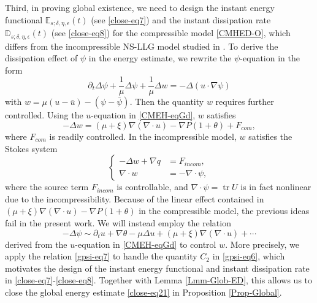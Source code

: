 \documentclass[reqno,11pt]{amsart}
\numberwithin{equation}{section}
\begin{document}
Third, in proving global existence, we need to design the instant energy functional $\mathbb{E}_{s;\delta,\eta,\epsilon}(t)$ (see \eqref{close-eq7}) and the instant dissipation rate $ \mathbb{D}_{s;\delta,\eta,\epsilon}(t) $ (see \eqref{close-eq8}) for the compressible model \eqref{CMHED-O}, which differs from the incompressible NS-LLG model studied in \cite{JLL-JDE-2023}. To derive the dissipation effect of $\psi$ in the energy estimate, we rewrite the $ \psi $-equation in the form
$$
\partial_t \Delta \psi + \frac{1}{\mu} \Delta \psi + \frac{1}{\mu} \Delta w = -\Delta(u \cdot \nabla \psi)
$$
with $ w = \mu(u - \bar{u}) - (\psi - \bar{\psi}) $. Then the quantity $w$ requires further controlled. Using the $u$-equation in \eqref{CMEH-eqGd}, $w$ satisfies 
$$
-\Delta w = (\mu + \xi) \nabla (\nabla \cdot u) - \nabla P(1 + \theta) + F_{com},
$$
where $F_{com}$ is readily controlled. In the incompressible model, $w$ satisfies the Stokes system
$$
\left\{
\begin{aligned}
-\Delta w + \nabla q &= F_{{incom}}, \\
\nabla \cdot w &= -\nabla \cdot \psi,
\end{aligned}
\right.
$$
where the source term $F_{{incom}}$ is controllable, and $\nabla \cdot \psi = \operatorname{tr} U$ is in fact nonlinear due to the incompressibility. Because of the linear effect contained in $(\mu + \xi) \nabla (\nabla \cdot u) - \nabla P(1 + \theta)$ in the compressible model, the previous ideas fail in the present work. We will instead employ the relation
$$ -\Delta \psi \sim \partial_{t} u + \nabla \theta -\mu \Delta u +(\mu + \xi) \nabla (\nabla \cdot u) + \cdots  $$
derived from the $u$-equation in \eqref{CMEH-eqGd} to control $w$. More precisely, we apply the relation \eqref{gpsi-eq7} to handle the quantity $C_2$ in \eqref{gpsi-eq6}, which motivates the design of the instant energy functional and instant dissipation rate in \eqref{close-eq7}-\eqref{close-eq8}. Together with Lemma \ref{Lmm-Glob-ED}, this allows us to close the global energy estimate \eqref{close-eq21} in Proposition \ref{Prop-Global}.
\end{document}
